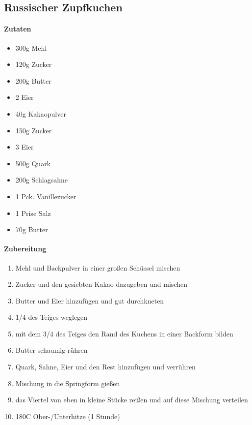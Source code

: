 \newpage
\subsection{Russischer Zupfkuchen}
\paragraph{Zutaten}
\begin{itemize}[noitemsep]
	\item 300g Mehl
	\item 120g Zucker
	\item 200g Butter
	\item 2 Eier
	\item 40g Kakaopulver
	\vspace{0.5cm}
	\item 150g Zucker
	\item 3 Eier
	\item 500g Quark
	\item 200g Schlagsahne
	\item 1 Pck. Vanillezucker
	\item 1 Prise Salz
	\item 70g Butter
\end{itemize}
\paragraph{Zubereitung}
\begin{enumerate}[noitemsep]
	\item Mehl und Backpulver in einer großen Schüssel mischen
	\item Zucker und den gesiebten Kakao dazugeben und mischen
	\item Butter und Eier hinzufügen und gut durchkneten
	\item 1/4 des Teiges weglegen
	\item mit dem 3/4 des Teiges den Rand des Kuchens in einer Backform bilden
	\vspace{0.5cm}
	\item Butter schaumig rühren
	\item Quark, Sahne, Eier und den Rest hinzufügen und verrühren
	\item Mischung in die Springform gießen
	\item das Viertel von eben in kleine Stücke reißen und auf diese Mischung verteilen
	\item 180\textdegree C Ober-/Unterhitze (1 Stunde)
\end{enumerate}
